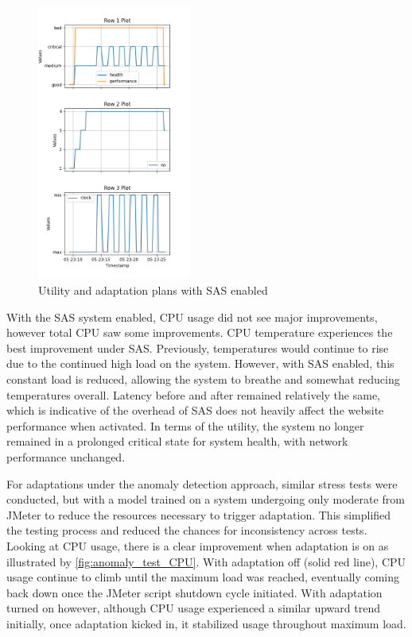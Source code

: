 \documentclass[conference]{IEEEtran}
\begin{document}
\begin{figure}[H]
    \centering
    \includegraphics[width=0.45\textwidth]{./media/after_SAS_utility_and_plans.png}
    \caption{Utility and adaptation plans with SAS enabled}
    \label{fig:after_SAS_utility_and_plans}
\end{figure}

With the SAS system enabled, CPU usage did not see major improvements, however total CPU saw some improvements. CPU temperature experiences the best improvement under SAS. Previously, temperatures would continue to rise due to the continued high load on the system. However, with SAS enabled, this constant load is reduced, allowing the system to breathe and somewhat reducing temperatures overall. Latency before and after remained relatively the same, which is indicative of the overhead of SAS does not heavily affect the website performance when activated. In terms of the utility, the system no longer remained in a prolonged critical state for system health, with network performance unchanged.

For adaptations under the anomaly detection approach, similar stress tests were conducted, but with a model trained on a system undergoing only moderate from JMeter to reduce the resources necessary to trigger adaptation. This simplified the testing process and reduced the chances for inconsistency across tests. Looking at CPU usage, there is a clear improvement when adaptation is on as illustrated by \ref{fig:anomaly_test_CPU}. With adaptation off (solid red line), CPU usage continue to climb until the maximum load was reached, eventually coming back down once the JMeter script shutdown cycle initiated. With adaptation turned on however, although CPU usage experienced a similar upward trend initially, once adaptation kicked in, it stabilized usage throughout maximum load.
\end{document}
